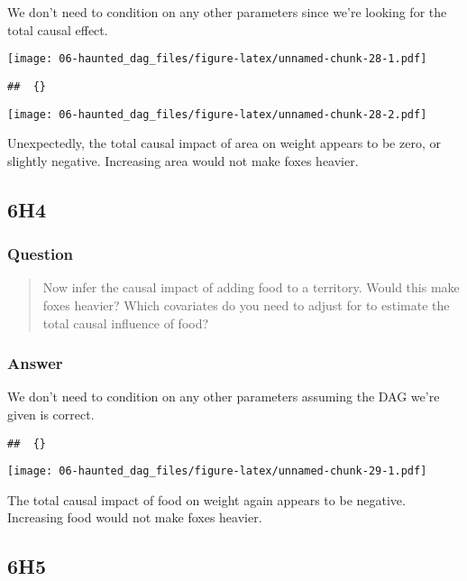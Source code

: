 \documentclass[
]{book}
\begin{document}
We don't need to condition on any other parameters since we're looking for the total causal effect.

\texttt{[image: 06-haunted\_dag\_files/figure-latex/unnamed-chunk-28-1.pdf]}

\begin{verbatim}
##  {}
\end{verbatim}

\texttt{[image: 06-haunted\_dag\_files/figure-latex/unnamed-chunk-28-2.pdf]}

Unexpectedly, the total causal impact of area on weight appears to be zero, or slightly negative. Increasing area would not make foxes heavier.

\hypertarget{h4-2}{%
\subsection*{6H4}\label{h4-2}}

\hypertarget{question-58}{%
\subsubsection*{Question}\label{question-58}}

\begin{quote}
Now infer the causal impact of adding food to a territory. Would this make foxes heavier? Which covariates do you need to adjust for to estimate the total causal influence of food?
\end{quote}

\hypertarget{answer-58}{%
\subsubsection*{Answer}\label{answer-58}}

We don't need to condition on any other parameters assuming the DAG we're given is correct.

\begin{verbatim}
##  {}
\end{verbatim}

\texttt{[image: 06-haunted\_dag\_files/figure-latex/unnamed-chunk-29-1.pdf]}

The total causal impact of food on weight again appears to be negative. Increasing food would not make foxes heavier.

\hypertarget{h5-1}{%
\subsection*{6H5}\label{h5-1}}
\end{document}
